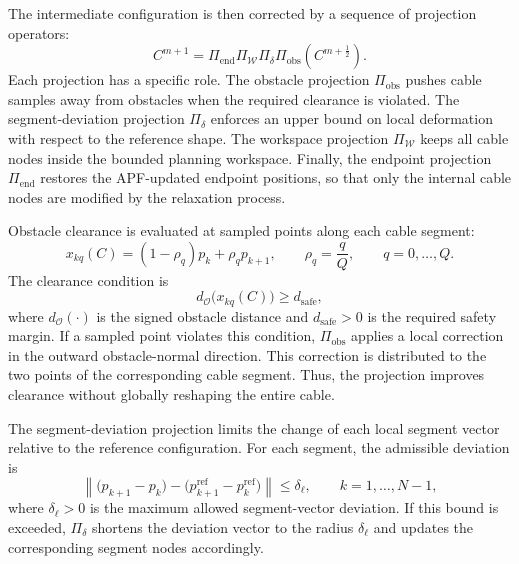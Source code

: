 \documentclass{pas}
\begin{document}
The intermediate configuration is then corrected by a sequence of projection
operators:
\begin{equation}
C^{m+1}
=
\Pi_{\mathrm{end}}
\Pi_{\mathcal{W}}
\Pi_{\delta}
\Pi_{\mathrm{obs}}
\left(
C^{m+\frac{1}{2}}
\right).
\label{eq:relaxation_projection_step}
\end{equation}
Each projection has a specific role. The obstacle projection \(\Pi_{\mathrm{obs}}\) pushes cable samples away from obstacles when the required clearance is violated. The segment-deviation projection \(\Pi_{\delta}\) enforces an upper bound on local deformation with respect to the reference shape. The workspace projection \(\Pi_{\mathcal{W}}\) keeps all cable nodes inside the bounded planning workspace. Finally, the endpoint projection \(\Pi_{\mathrm{end}}\) restores the APF-updated endpoint positions, so that only the internal cable nodes are modified by the relaxation process.

Obstacle clearance is evaluated at sampled points along each cable segment:
\begin{equation}
x_{kq}(C)
=
(1-\rho_q)p_k+\rho_q p_{k+1},
\qquad
\rho_q=\frac{q}{Q},
\qquad
q=0,\ldots,Q .
\label{eq:relaxation_sampled_points}
\end{equation}
The clearance condition is
\begin{equation}
d_{\mathcal{O}}\bigl(x_{kq}(C)\bigr)
\geq
d_{\mathrm{safe}},
\label{eq:relaxation_clearance_constraint}
\end{equation}
where \(d_{\mathcal{O}}(\cdot)\) is the signed obstacle distance and
\(d_{\mathrm{safe}}>0\) is the required safety margin. If a sampled point
violates this condition, \(\Pi_{\mathrm{obs}}\) applies a local correction in
the outward obstacle-normal direction. This correction is distributed to the
two points of the corresponding cable segment. Thus, the projection improves
clearance without globally reshaping the entire cable.

The segment-deviation projection limits the change of each local segment vector
relative to the reference configuration. For each segment, the admissible
deviation is
\begin{equation}
\left\|
\bigl(p_{k+1}-p_k\bigr)
-
\bigl(p_{k+1}^{\mathrm{ref}}-p_k^{\mathrm{ref}}\bigr)
\right\|
\leq
\delta_{\ell},
\qquad
k=1,\ldots,N-1 ,
\label{eq:relaxation_segment_constraint}
\end{equation}
where \(\delta_{\ell}>0\) is the maximum allowed segment-vector deviation. If
this bound is exceeded, \(\Pi_{\delta}\) shortens the deviation vector to the
radius \(\delta_{\ell}\) and updates the corresponding segment nodes
accordingly.
\end{document}
